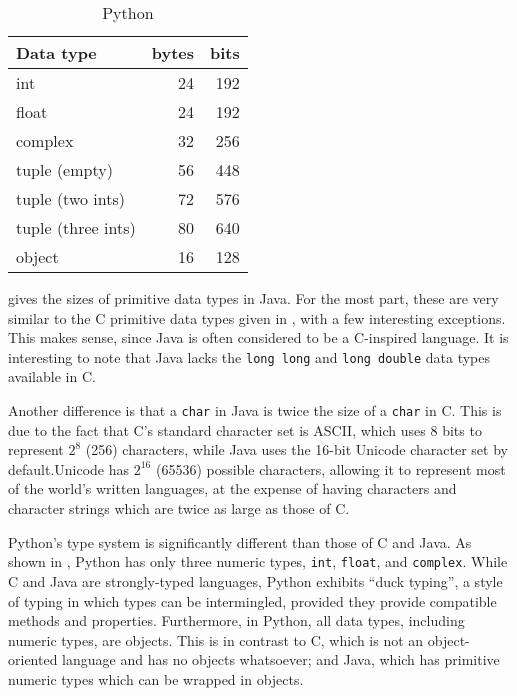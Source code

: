 \documentclass[12pt,letterpaper]{article}
\begin{document}
\begin{table}[H]
\begin{subtable}[t]{.33\linewidth}
		      \centering
		        \caption{Python}
		        \label{table:pri-py}
					\begin{tabular}{l r r}
						\toprule
						Data type & bytes & bits\\
						\midrule
						int          &     24 &    192 \\
						float        &     24 &    192 \\
						complex      &     32 &    256 \\
						tuple (empty)       &     56 &    448 \\
						tuple (two ints)       &     72 &    576 \\
						tuple  (three ints)      &     80 &    640 \\
						object       &     16 &    128 \\
						  \bottomrule
		        \end{tabular}
		    \end{subtable} 
		\end{table}

		 gives the sizes of primitive data types in Java. For the most part, these are very similar to the C primitive data types given in , with a few interesting exceptions. This makes sense, since Java is often considered to be a C-inspired language. It is interesting to note that Java lacks the \texttt{long long} and \texttt{long double} data types available in C. 

		Another difference is that a \texttt{char} in Java is twice the size of a \texttt{char} in C. This is due to the fact that C's standard character set is ASCII, which uses 8 bits to represent $2^8$ (256) characters, while Java uses the 16-bit Unicode character set by default.Unicode has $2^16$ (65536) possible characters, allowing it to represent most of the world's written languages, at the expense of having characters and character strings which are twice as large as those of C.

		Python's type system is significantly different than those of C and Java. As shown in , Python has only three numeric types, \texttt{int}, \texttt{float}, and \texttt{complex}. While C and Java are strongly-typed languages, Python exhibits ``duck typing'', a style of typing in which types can be intermingled, provided they provide compatible methods and properties. Furthermore, in Python, all data types, including numeric types, are objects. This is in contrast to C, which is not an object-oriented language and has no objects whatsoever; and Java, which has primitive numeric types which can be wrapped in objects. 
\end{document}
